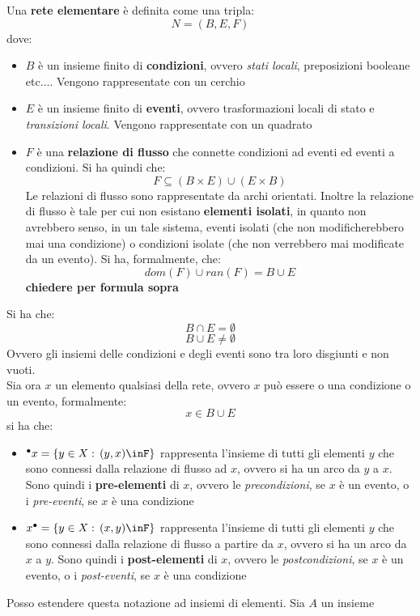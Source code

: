 \documentclass[a4paper,12pt, oneside]{book}
\begin{document}
\begin{definizione}
  Una \textbf{rete elementare} è definita come una tripla:
  \[N=(B,E,F)\]
  dove:
  \begin{itemize}
    \item $B$ è un insieme finito di \textbf{condizioni}, ovvero \textit{stati
      locali}, preposizioni booleane etc$\ldots$. Vengono rappresentate con un
    cerchio 
    \item $E$ è un insieme finito di \textbf{eventi}, ovvero trasformazioni
    locali di stato e \textit{transizioni locali}. Vengono rappresentate con un
    quadrato 
    \item $F$ è una \textbf{relazione di flusso} che connette condizioni ad
    eventi ed eventi a condizioni. Si ha quindi che:
    \[F\subseteq (B\times E)\cup(E\times B)\]
    Le relazioni di flusso sono rappresentate da archi orientati. Inoltre la
    relazione di flusso è tale per cui non esistano \textbf{elementi isolati},
    in quanto non avrebbero senso, in un tale sistema, eventi isolati (che non
    modificherebbero mai una condizione) o condizioni isolate (che non
    verrebbero mai modificate da un evento). Si ha, formalmente, che: 
    \[dom(F)\cup ran(F)=B\cup E\]
    \textbf{chiedere per formula sopra}
  \end{itemize}
  Si ha che:
  \[B\cap E = \emptyset\]
  \[B\cup E \neq \emptyset\]
  Ovvero gli insiemi delle condizioni e degli eventi sono tra loro disgiunti e
  non vuoti.\\
  Sia ora $x$ un elemento qualsiasi della rete, ovvero $x$ può essere o una
  condizione o un evento, formalmente:
  \[x\in B\cup E\]
  si ha che:
  \begin{itemize}
    \item $^\bullet x=\{y\in X:\,(y,x)\inF\}$ rappresenta l'insieme di tutti gli
    elementi $y$ che sono connessi dalla relazione di flusso ad $x$, ovvero si
    ha un arco da $y$ a $x$. Sono quindi i \textbf{pre-elementi} di $x$, ovvero
    le \textit{precondizioni}, se $x$ è un evento, o i \textit{pre-eventi}, se
    $x$ è una condizione
    \item $x^\bullet=\{y\in X:\,(x,y)\inF\}$ rappresenta l'insieme di tutti gli
    elementi $y$ che sono connessi dalla relazione di flusso a partire da $x$,
    ovvero si ha un arco da $x$ a $y$. Sono quindi i \textbf{post-elementi} di
    $x$, ovvero le \textit{postcondizioni}, se $x$ è un evento, o i
    \textit{post-eventi}, se $x$ è una condizione
  \end{itemize}
  Posso estendere questa notazione ad insiemi di elementi. Sia $A$ un insieme

\end{definizione}
\end{document}

